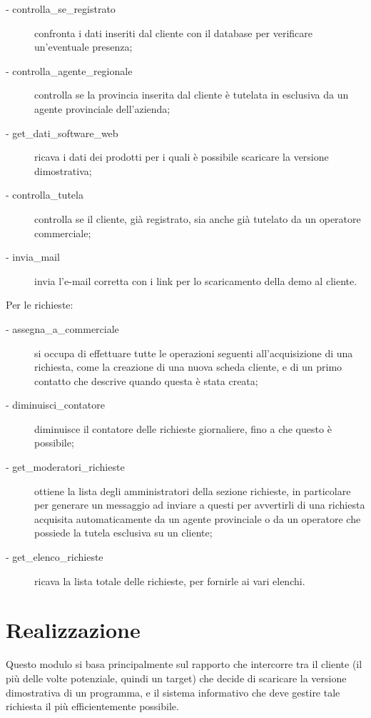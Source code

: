 \begin{description}
\item[- controlla\_{}se\_{}registrato] confronta i dati inseriti dal cliente con il database per verificare un'eventuale presenza;
\item[- controlla\_{}agente\_{}regionale] controlla se la provincia inserita dal cliente \`e tutelata in esclusiva da un agente provinciale dell'azienda;
\item[- get\_{}dati\_{}software\_{}web] ricava i dati dei prodotti per i quali \`e possibile scaricare la versione dimostrativa;
\item[- controlla\_{}tutela] controlla se il cliente, gi\`a registrato, sia anche gi\`a tutelato da un operatore commerciale;
\item[- invia\_{}mail] invia l'e-mail corretta con i link per lo scaricamento della demo al cliente.
\end{description}
\noindent
Per le richieste:
\begin{description}
\item[- assegna\_{}a\_{}commerciale] si occupa di effettuare tutte le operazioni seguenti all'acquisizione di una richiesta, come la creazione di una nuova scheda cliente, e di un primo contatto che descrive quando questa \`e stata creata;
\item[- diminuisci\_{}contatore] diminuisce il contatore delle richieste giornaliere, fino a che questo \`e possibile;
\item[- get\_{}moderatori\_{}richieste] ottiene la lista degli amministratori della sezione richieste, in particolare per generare un messaggio ad inviare a questi per avvertirli di una richiesta acquisita automaticamente da un agente provinciale o da un operatore che possiede la tutela esclusiva su un cliente;
\item[- get\_{}elenco\_{}richieste] ricava la lista totale delle richieste, per fornirle ai vari elenchi.
\end{description}


\newpage
\section{Realizzazione}
Questo modulo si basa principalmente sul rapporto che intercorre tra il cliente (il pi\`u delle volte potenziale, quindi un target) che decide di scaricare la versione dimostrativa di un programma, e il sistema informativo che deve gestire tale richiesta il pi\`u efficientemente possibile.

